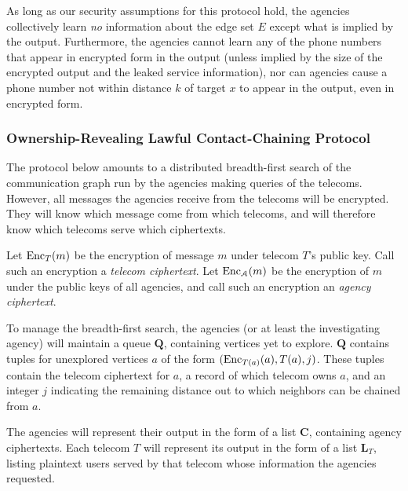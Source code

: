 As long as our security assumptions for this protocol hold, the agencies collectively learn \emph{no} information about the edge set $E$ except what is implied by the output. Furthermore, the agencies cannot learn any of the phone numbers that appear in encrypted form in the output (unless implied by the size of the encrypted output and the leaked service information), nor can agencies cause a phone number not within distance $k$ of target $x$ to appear in the output, even in encrypted form.



\subsubsection{Ownership-Revealing Lawful Contact-Chaining Protocol}

\label{sec-proto1}



The protocol below amounts to a distributed breadth-first search of the communication graph run by the agencies making queries of the telecoms. However, all messages the agencies receive from the telecoms will be encrypted. They will know which message come from which telecoms, and will therefore know which telecoms serve which ciphertexts.



Let $\operatorname{Enc}_T(m)$ be the encryption of message $m$ under telecom $T$'s public key. Call such an encryption a \emph{telecom ciphertext}. Let $\operatorname{Enc}_\mathcal{A}(m)$ be the encryption of $m$ under the public keys of all agencies, and call such an encryption an \emph{agency ciphertext}.



To manage the breadth-first search, the agencies (or at least the investigating agency) will maintain a queue $\mathbf{Q}$, containing vertices yet to explore. $\mathbf{Q}$ contains tuples for unexplored vertices $a$ of the form $(\operatorname{Enc}_{T(a)}(a), T(a), j)$. These tuples contain the telecom ciphertext for $a$, a record of which telecom owns $a$, and an integer $j$ indicating the remaining distance out to which neighbors can be chained from $a$.



The agencies will represent their output in the form of a list $\mathbf{C}$, containing agency ciphertexts. Each telecom $T$ will represent its output in the form of a list $\mathbf{L}_T$, listing plaintext users served by that telecom whose information the agencies requested.



